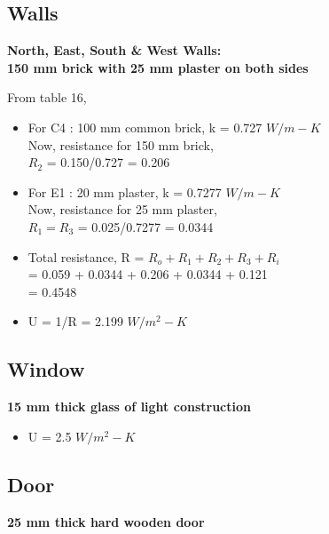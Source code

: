 \documentclass{article}
\begin{document}
  \subsection{Walls}
  \begin{center}
    \textbf{North, East, South \& West Walls: \\150 mm brick with 25 mm plaster on both sides} \\
  \end{center}
  From table 16,
  \begin{itemize}
    \item For C4 : 100 mm common brick, k = 0.727 $W/m-K$\\
    Now, resistance for 150 mm brick,\\ $R_2$ = 0.150/0.727 = 0.206 
    \item For E1 : 20 mm plaster, k = 0.7277 $W/m-K$\\
    Now, resistance for 25 mm plaster,\\ $R_1 = R_3$ = 0.025/0.7277 = 0.0344 
    \item Total resistance, R = $R_o + R_1 + R_2 + R_3 + R_i$ \\= 0.059 + 0.0344 + 0.206  + 0.0344 + 0.121 \\= 0.4548 
    \item U = 1/R = 2.199 $W/m^2-K$ 
  \end{itemize}

  \vspace{0.5cm}
  \subsection{Window}
  \begin{center}
    \textbf{15 mm thick glass of light construction} \\
  \end{center}

  \begin{itemize}
    \item U = 2.5 $W/m^2-K$
  \end{itemize}

  \vspace{0.5cm}
  \subsection{Door}
  \begin{center}
    \textbf{25 mm thick hard wooden door} \\
  \end{center}
\end{document}
